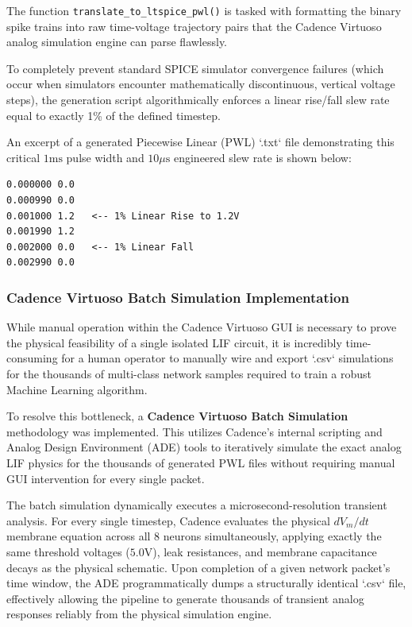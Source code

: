 \documentclass{ieeeaccess}
\begin{document}
The function \texttt{translate\_to\_ltspice\_pwl()} is tasked with formatting the binary spike trains into raw time-voltage trajectory pairs that the Cadence Virtuoso analog simulation engine can parse flawlessly. 

To completely prevent standard SPICE simulator convergence failures (which occur when simulators encounter mathematically discontinuous, vertical voltage steps), the generation script algorithmically enforces a linear rise/fall slew rate equal to exactly 1\% of the defined timestep.

An excerpt of a generated Piecewise Linear (PWL) `.txt` file demonstrating this critical $1\text{ms}$ pulse width and $10\mu\text{s}$ engineered slew rate is shown below:
\begin{verbatim}
0.000000 0.0
0.000990 0.0
0.001000 1.2   <-- 1% Linear Rise to 1.2V
0.001990 1.2
0.002000 0.0   <-- 1% Linear Fall
0.002990 0.0
\end{verbatim}

\subsubsection{Cadence Virtuoso Batch Simulation Implementation}

While manual operation within the Cadence Virtuoso GUI is necessary to prove the physical feasibility of a single isolated LIF circuit, it is incredibly time-consuming for a human operator to manually wire and export `.csv` simulations for the thousands of multi-class network samples required to train a robust Machine Learning algorithm.

To resolve this bottleneck, a \textbf{Cadence Virtuoso Batch Simulation} methodology was implemented. This utilizes Cadence's internal scripting and Analog Design Environment (ADE) tools to iteratively simulate the exact analog LIF physics for the thousands of generated PWL files without requiring manual GUI intervention for every single packet. 

The batch simulation dynamically executes a microsecond-resolution transient analysis. For every single timestep, Cadence evaluates the physical $dV_m/dt$ membrane equation across all 8 neurons simultaneously, applying exactly the same threshold voltages ($5.0\text{V}$), leak resistances, and membrane capacitance decays as the physical schematic. Upon completion of a given network packet's time window, the ADE programmatically dumps a structurally identical `.csv` file, effectively allowing the pipeline to generate thousands of transient analog responses reliably from the physical simulation engine.
\end{document}
